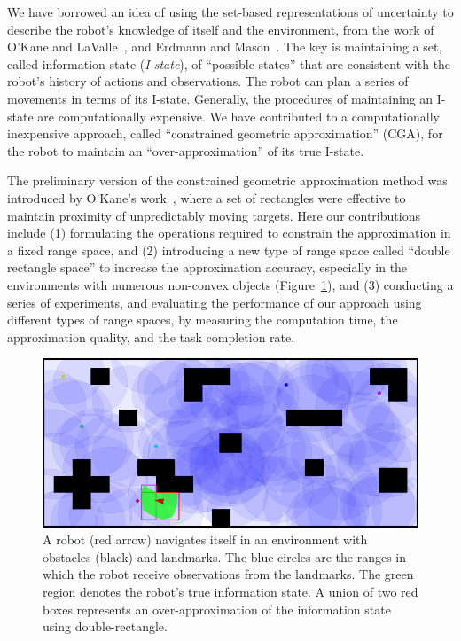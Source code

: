 We have borrowed an idea of using the set-based representations of uncertainty to describe the robot's knowledge of
itself and the environment, from the work of O'Kane and LaValle~\cite{OKaLav08,Lav06}, and Erdmann and Mason~\cite{ErdMas88}. 
The key is maintaining a set, called information state (\textit{I-state}), of ``possible states'' that are consistent with the robot's
history of actions and observations. 
The robot can plan a series of movements in terms of its I-state. 
Generally, the procedures of maintaining an I-state are
computationally expensive. 
We have contributed to a computationally
inexpensive approach, called ``constrained geometric
approximation'' (CGA), for the robot to maintain an ``over-approximation'' of its true
I-state.

The preliminary version of the constrained geometric approximation method was
introduced by O'Kane's work~\cite{OKa11}, where a set of rectangles
were effective to maintain proximity of unpredictably moving targets. 
Here our 
contributions include (1) formulating the operations required to constrain the
approximation in a fixed range space, and (2) introducing a new type of range
space called ``double rectangle space'' to increase the approximation accuracy, especially in the environments with numerous non-convex objects (Figure~\ref{fig:nav-clutter}), 
and (3) conducting a series of experiments, and evaluating the performance of
our approach using different types of range spaces, by measuring the computation time,
the approximation quality, and the task completion rate.

\begin{figure}
  \centering
  \includegraphics[width=.9\columnwidth]{figs/dbrect_clutter.png}
  \caption{A robot (red arrow) navigates itself in an environment with obstacles (black) and landmarks.
    The blue circles are the ranges in which the robot receive observations from the landmarks.
    The green region denotes the robot's true information state. 
    A union of two red boxes represents an over-approximation
    of the information state using double-rectangle.}
  \label{fig:nav-clutter}
\end{figure}

